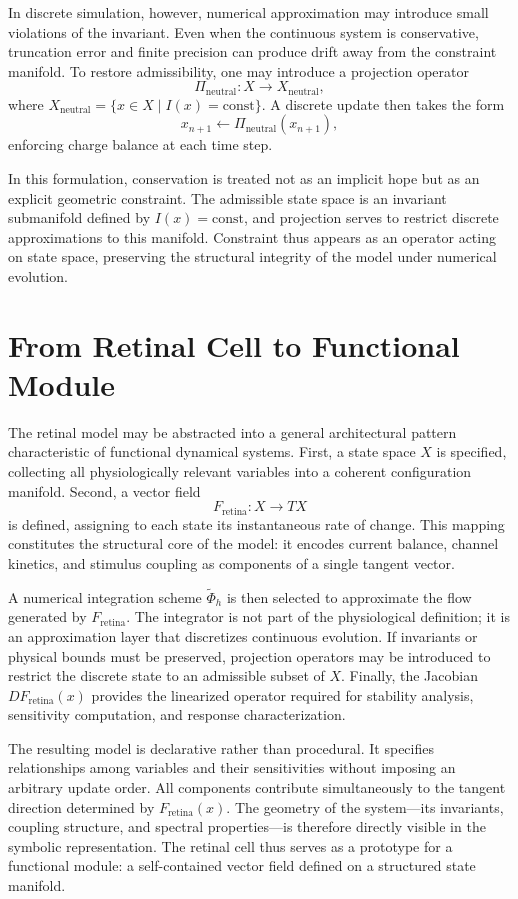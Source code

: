 \documentclass[12pt]{book}
\begin{document}
In discrete simulation, however, numerical approximation may introduce
small violations of the invariant. Even when the continuous system is
conservative, truncation error and finite precision can produce drift
away from the constraint manifold. To restore admissibility, one may
introduce a projection operator
\[
\Pi_{\text{neutral}} : X \to X_{\text{neutral}},
\]
where $X_{\text{neutral}} = \{ x \in X \mid I(x) = \text{const} \}$.
A discrete update then takes the form
\[
x_{n+1} \leftarrow \Pi_{\text{neutral}}(x_{n+1}),
\]
enforcing charge balance at each time step.

In this formulation, conservation is treated not as an implicit hope
but as an explicit geometric constraint. The admissible state space is
an invariant submanifold defined by $I(x)=\text{const}$, and projection
serves to restrict discrete approximations to this manifold. Constraint
thus appears as an operator acting on state space, preserving the
structural integrity of the model under numerical evolution.

\section{From Retinal Cell to Functional Module}

The retinal model may be abstracted into a general architectural
pattern characteristic of functional dynamical systems. First, a
state space $X$ is specified, collecting all physiologically relevant
variables into a coherent configuration manifold. Second, a vector
field
\[
F_{\text{retina}} : X \to TX
\]
is defined, assigning to each state its instantaneous rate of change.
This mapping constitutes the structural core of the model: it encodes
current balance, channel kinetics, and stimulus coupling as components
of a single tangent vector.

A numerical integration scheme $\tilde{\Phi}_h$ is then selected to
approximate the flow generated by $F_{\text{retina}}$. The integrator
is not part of the physiological definition; it is an approximation
layer that discretizes continuous evolution. If invariants or physical
bounds must be preserved, projection operators may be introduced to
restrict the discrete state to an admissible subset of $X$. Finally,
the Jacobian $DF_{\text{retina}}(x)$ provides the linearized operator
required for stability analysis, sensitivity computation, and response
characterization.

The resulting model is declarative rather than procedural. It specifies
relationships among variables and their sensitivities without imposing
an arbitrary update order. All components contribute simultaneously to
the tangent direction determined by $F_{\text{retina}}(x)$. The geometry
of the system---its invariants, coupling structure, and spectral
properties---is therefore directly visible in the symbolic
representation. The retinal cell thus serves as a prototype for a
functional module: a self-contained vector field defined on a structured
state manifold.
\end{document}
